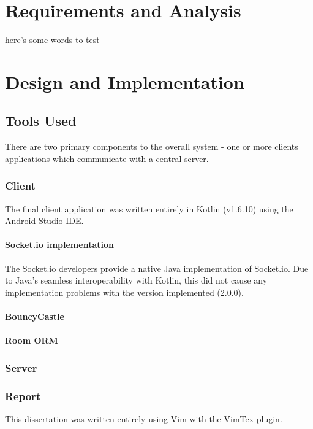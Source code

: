\documentclass{mproj}
\begin{document}
\chapter{Requirements and Analysis}\label{analysis}
here's some words to test

\chapter{Design and Implementation}\label{design}

\section{Tools Used}
There are two primary components to the overall system - one or more clients applications which communicate with a central server.

\subsection{Client}
The final client application was written entirely in Kotlin (v1.6.10) using the Android Studio IDE.

\subsubsection{Socket.io implementation}
The Socket.io developers provide a native Java implementation of Socket.io. Due to Java's seamless interoperability with Kotlin, this did not cause any implementation problems with the version implemented (2.0.0).

\subsubsection{BouncyCastle}


\subsubsection{Room ORM}

\subsubsection{}


\subsection{Server}

\subsection{Report}
This dissertation was written entirely using Vim with the VimTex plugin.
\end{document}
